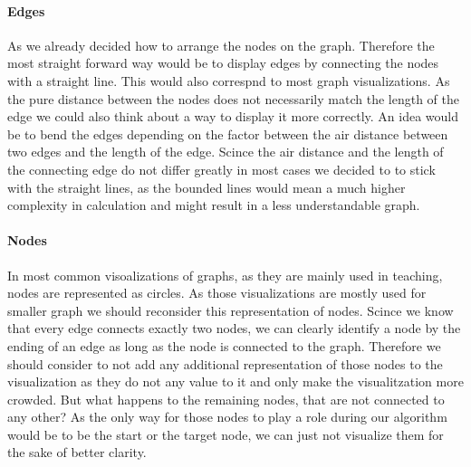 \documentclass
[
	paper = a4,
    pagesize,
	12 pt,
	oneside,                       %
    open = right,
	DIV = calc,
	BCOR = 0 mm,                   %
	bibtotoc
]
{scrbook}
\begin{document}
\paragraph{Edges}
As we already decided how to arrange the nodes on the graph.
Therefore the most straight forward way would be to display edges by connecting the nodes with a straight line.
This would also correspnd to most graph visualizations.
As the pure distance between the nodes does not necessarily match the length of the edge we could also think about a way to display it more correctly.
An idea would be to bend the edges depending on the factor between the air distance between two edges and the length of the edge.
Scince the air distance  and the length of the connecting edge do not differ greatly in most cases we decided to to stick with the straight lines, as the bounded lines would mean a much higher complexity in calculation and might result in a less understandable graph.



\paragraph{Nodes}
In most common visoalizations of graphs, as they are mainly used in teaching, nodes are represented as circles.
As those visualizations are mostly used for smaller graph we should reconsider this representation of nodes.
Scince we know that every edge connects exactly two nodes, we can clearly identify a node by the ending of an edge as long as the node is connected to the graph.
Therefore we should consider to not add any additional representation of those nodes to the visualization as they do not any value to it and only make the visualitzation more crowded.
But what happens to the remaining nodes, that are not connected to any other?
As the only way for those nodes to play a role during our algorithm would be to be the start or the target node, we can just not visualize them for the sake of better clarity.

\end{document}
